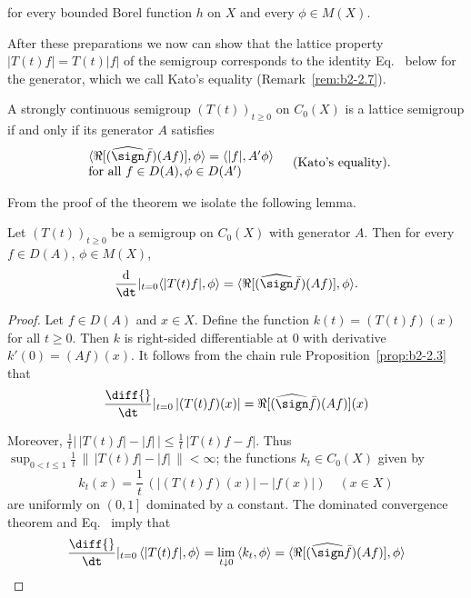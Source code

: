 for every bounded Borel function $h$ on $X$ and every $\phi \in M(X)$.

After these preparations we now can show that the lattice property $|T(t)f| = T(t)|f|$ of the semigroup corresponds to the identity Eq.~ below for the generator, which we call Kato's equality (\cf Remark~\ref{rem:b2-2.7}).

\begin{theorem}\label{thm:b2-2.5}
A strongly continuous semigroup $(T(t))_{t \geq 0}$ on $C_{0}(X)$ is a lattice semigroup if and only if its generator $A$ satisfies
\begin{equation}\label{eq:b2-2.9}
\begin{array}{l}
\langle \Re[(\widehat{\sign} \bar{f})(Af)],\phi \rangle = \langle |f|,A'\phi \rangle \\
\text{for all } f \in D(A), \phi \in D(A') 
\end{array} \quad \text{(Kato's equality)}.
\end{equation}
\end{theorem}

From the proof of the theorem we isolate the following lemma.

\begin{lemma}\label{lem:b2-2.6}
Let $(T(t))_{t \geq 0}$ be a semigroup on $C_{0}(X)$ with generator $A$.
Then for every $f \in D(A)$, $\phi \in M(X)$,
\begin{equation}\label{eq:b2-2.10}
\frac{\mathrm{d}}{\dt}
|_{t = 0} \langle |T(t)f|,\phi \rangle = \langle \Re[(\widehat{\sign} \bar{f})(Af)],\phi \rangle.
\end{equation}
\end{lemma}

\begin{proof}
Let $f \in D(A)$ and $x \in X$.
Define the function $k(t) = (T(t)f)(x)$ for all $t \geq 0$.
Then $k$ is right-sided differentiable at $0$ with derivative $k'(0) = (Af)(x)$.
It follows from the chain rule Proposition~\ref{prop:b2-2.3} that
\begin{equation}\label{eq:b2-2.11}
\frac{\diff{}}{\dt}
|_{t = 0}\, |(T(t)f)(x)| = \Re[(\widehat{\sign} \bar{f})(Af)](x)
\end{equation}

Moreover, $\frac{1}{t} \left|\, |T(t)f| - |f| \, \right| \leq \frac{1}{t}\, |T(t)f - f|$.
Thus $\sup_{0 < t \leq 1} \frac{1}{t}\, \|\, |T(t)f| - |f|\, \| < \infty$; \ie  the functions $k_{t} \in C_{0}(X)$ given by
\begin{equation}\label{eq:b2-2.12}
k_{t}(x) = \frac{1}{t}\,(|(T(t)f)(x)| - |f(x)|) \quad (x \in X)
\end{equation}
are uniformly on $\left(0,1\right]$ dominated by a constant.
The dominated convergence theorem and Eq.~ imply that
\begin{align*}
\frac{\diff{}}{\dt}|_{t=0}\, \langle |T(t)f|,\phi \rangle = \lim_{t \downarrow 0}\, \langle k_{t},\phi \rangle = \langle \Re[(\widehat{\sign} \bar{f})(Af)],\phi \rangle
\end{align*}
\end{proof}

